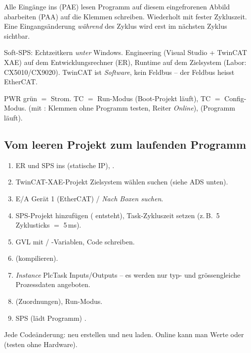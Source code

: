 \label{sec:twincat}

\begin{formel}
 Alle Eingänge ins  (PAE) lesen
\ra {} Programm auf diesem eingefrorenen Abbild abarbeiten
\ra {}  (PAA) auf die Klemmen schreiben.
Wiederholt mit fester Zykluszeit. Eine Eingangsänderung \emph{während}
des Zyklus wird erst im nächsten Zyklus sichtbar.
\end{formel}

 Soft-SPS: Echtzeitkern \emph{unter} Windows. Engineering
(Visual Studio + TwinCAT XAE) auf dem Entwicklungsrechner (ER), Runtime auf
dem Zielsystem (Labor: CX5010/CX9020). TwinCAT ist \emph{Software}, kein
Feldbus -- der Feldbus heisst EtherCAT.

 PWR grün $=$ Strom. TC  $=$ Run-Modus (Boot-Projekt
läuft), TC  $=$ Config-Modus.
  (mit : Klemmen ohne Programm testen,
Reiter \emph{Online}),  (Programm läuft).

\subsection{Vom leeren Projekt zum laufenden Programm}
\begin{rezept}[Ablauf (AS 1)]
\begin{enumerate}
\item ER und SPS ins  (statische IP), .
\item TwinCAT-XAE-Projekt \ra Zielsystem wählen \ra suchen \ra
   (siehe ADS unten).
\item E/A \ra Gerät 1 (EtherCAT) \ra {} / \emph{Nach Boxen suchen}.
\item SPS-Projekt hinzufügen ( entsteht), Task-Zykluszeit setzen
  (z.\,B.\ 5 Zyklusticks $=$ 5\,ms).
\item GVL mit  / -Variablen, Code schreiben.
\item {} (kompilieren).
\item \emph{Instance} \ra PlcTask Inputs/Outputs \ra {}
  -- es werden nur typ- und grössengleiche Prozessdaten angeboten.
\item {} (Zuordnungen), Run-Modus.
\item SPS \ra {} (lädt Programm) \ra {}.
\end{enumerate}
Jede Codeänderung: neu erstellen und neu laden. Online kann man Werte
 oder  (testen ohne Hardware).
\end{rezept}

